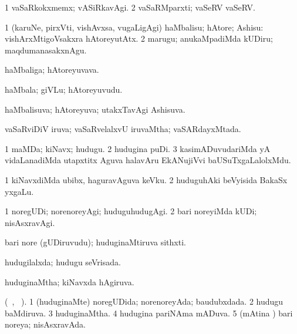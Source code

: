 \bentry
{} 
\gl{\kirxvi}
\bmng
\bnum
\num{1} vaSaRkokxmemx; vASiRkavAgi. 
\num{2} vaSaRMparxti; vaSeRV  vaSeRV.
\enum
\emng
\eentry

\bentry
{} 
\gl{\akirx} 
\bmng
\bnum
\num{1} (karuNe, pirxVti, vishAvxsa, \mo vugaLigAgi) haMbalisu; hAtore; Ashisu:  vishArxMtigoVsakxra hAtoreyutAtx. 
\num{2} marugu; anukaMpadiMda kUDiru; maqdumanasakxnAgu.
\enum
\emng
\eentry

\bentry
{} 
\gl{\nA} 
\bmng
haMbaliga; hAtoreyuvava.
\emng
\eentry

\bentry
{} 
\gl{\nA} 
\bmng
haMbala; giVLu; hAtoreyuvudu.
\emng
\eentry

\bentry
{} 
\gl{\gu} 
\bmng
haMbalisuva; hAtoreyuva; utakxTavAgi Ashisuva.
\emng
\eentry

\bentry
{} 
\gl{\gu} 
\bmng
vaSaRviDiV iruva; vaSaRvelalxvU iruvaMtha; vaSARdayxMtada.
\emng
\eentry 

\bentry
{} 
\gl{\nA} 
\bmng
\bnum
\num{1} maMDa; kiNavx; hudugu. 
\num{2} hudugina puDi. 
\num{3} kasimADuvudariMda yA vidaLanadiMda utapxtitx Aguva halavAru EkANujiVvi baUSuTxgaLalolxMdu.
\enum
\emng 

\noindent	
\gl{\pagu} 
\bmng
\bnum
\num{1}  kiNavxdiMda  ubibx, haguravAguva keVku. 
\num{2}  huduguhAki beVyisida BakaSx yxgaLu.
\enum
\emng
\eentry

\bentry
{} 
\gl{\kirxvi} 
\bmng
\bnum
\num{1} noregUDi; norenoreyAgi; huduguhudugAgi. 
\num{2} bari noreyiMda kUDi; nisAsxravAgi.
\enum
\emng
\eentry

\bentry
{} 
\gl{\nA} 
\bmng
bari nore (gUDiruvudu); huduginaMtiruva sithxti.
\emng
\eentry

\bentry
{} 
\gl{\gu} 
\bmng
hudugilalxda; hudugu seVrisada.
\emng
\eentry

\bentry
{} 
\gl{\gu} 
\bmng
huduginaMtha; kiNavxda hAgiruva.
\emng
\eentry

\bentry
{} 
\gl{\gu} 
\bmng
(\tara\ , \tama\ ).  
\bnum
\num{1} (huduginaMte) noregUDida; norenoreyAda; baudubxdada. 
\num{2} hudugu baMdiruva. 
\num{3} huduginaMtha. 
\num{4} hudugina pariNAma mADuva. 
\num{5} (mAtina \vi) bari noreya; nisAsxravAda.
\enum
\emng
\eentry


